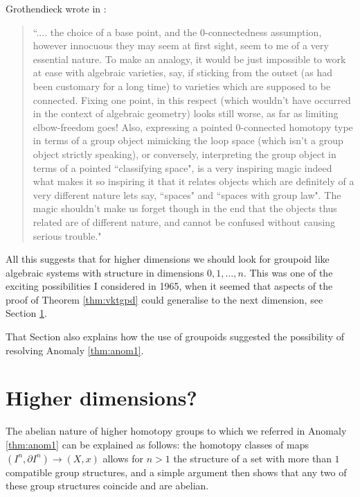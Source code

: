 \documentclass{elsarticle}
\begin{document}
Grothendieck wrote in \cite[24 April, 1983]{Gr-cor}:  \begin{quote}``....  the choice of a base point, and the $0$-connectedness assumption,
however innocuous they may seem at first sight, seem to me of a
very essential nature.  To make an analogy, it would be just impossible to work at ease with
algebraic varieties, say, if sticking from the outset (as had been customary for a long time)
to varieties which are supposed to be connected.   Fixing one point,  in this respect (which
wouldn't have occurred in the context of algebraic geometry) looks still worse, as far as limiting
elbow-freedom goes! Also, expressing a pointed 0-connected homotopy type in terms of a group
object mimicking the loop space (which isn't a group object strictly speaking), or conversely,
interpreting the group object in terms of a pointed ``classifying space", is a very inspiring magic
indeed  what makes it so inspiring it that it relates objects which are definitely of a very different
nature lets say, ``spaces" and ``spaces with group law". The magic shouldn't make us forget though
in the end that the objects thus related are of different nature, and cannot be confused without
causing serious trouble."
\end{quote}

All this suggests that for higher dimensions we should look for groupoid like algebraic
systems with structure in dimensions $0, 1, \ldots, n$.  This was one of the exciting possibilities I
considered in 1965, when it seemed that aspects of the proof of Theorem \ref{thm:vktgpd} could generalise
to the next dimension, see Section \ref{sec:hdim}.



That Section also explains how the use of groupoids suggested the possibility of resolving
Anomaly \ref{thm:anom1}.

\section{Higher dimensions?} \label{sec:hdim}
The abelian nature of higher homotopy groups to which we
referred in Anomaly \ref{thm:anom1} can be explained as follows:  the homotopy
classes of maps $(I^n , \partial I^ n ) \to (X, x)$  allows for $n > 1$ the structure of a set with more than $1$
compatible group structures, and a simple argument then shows that any two of these group
structures coincide and are abelian.
\end{document}
